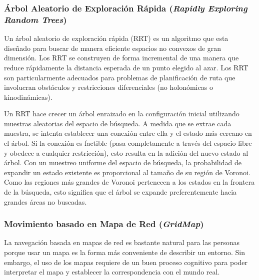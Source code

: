 
\subsubsection{\'Arbol Aleatorio de Exploraci\'on R\'apida (\textit{Rapidly Exploring Random Trees})}

Un \'arbol aleatorio de exploraci\'on r\'apida (RRT) es un algoritmo que 
esta dise\~nado para buscar de manera eficiente espacios no 
convexos de gran dimensi\'on. Los RRT se construyen de forma 
incremental de una manera que reduce r\'apidamente la distancia esperada 
de un punto elegido al azar. Los RRT son particularmente adecuados 
para problemas de planificaci\'on de ruta que involucran obst\'aculos
y restricciones diferenciales (no holon\'omicas o kinodin\'amicas).

Un RRT hace crecer un \'arbol enraizado en la configuraci\'on inicial 
utilizando muestras aleatorias del espacio de b\'usqueda. A medida
que se extrae cada muestra, se intenta establecer una conexi\'on entre 
ella y el estado m\'as cercano en el \'arbol. Si la conexi\'on es factible
(pasa completamente a trav\'es del espacio libre y obedece
a cualquier restricci\'on), esto resulta en la adici\'on del nuevo estado al 
\'arbol. Con un muestreo uniforme del espacio de b\'usqueda, la probabilidad de 
expandir un estado existente es proporcional al tama\~no de su regi\'on de Voronoi. Como 
las regiones m\'as grandes de Voronoi pertenecen a los estados en la frontera
de la b\'usqueda, esto significa que el \'arbol se expande preferentemente hacia 
grandes \'areas no buscadas. 

\subsubsection{Movimiento basado en Mapa de Red (\textit{GridMap})}

La navegaci\'on basada en mapas de red es bastante natural para las personas 
porque usar un mapa es la forma m\'as conveniente de describir un entorno. 
Sin embargo, el uso de los mapas requiere de un buen proceso cognitivo para 
poder interpretar el mapa y establecer la correspondencia con el mundo real.

